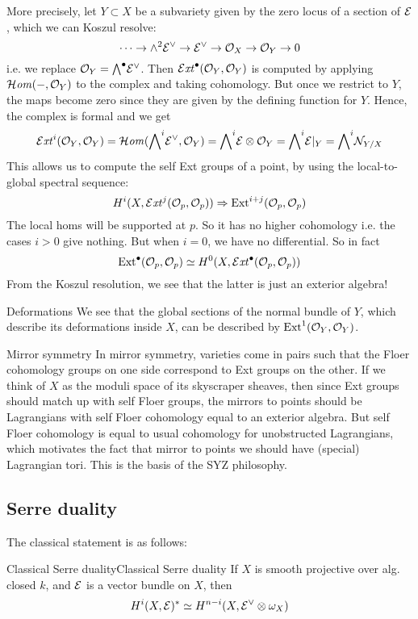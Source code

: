 More precisely, let $Y\subset X$ be a subvariety given by the zero locus of a section of $\mathcal{E}$, which we can Koszul resolve:
$$\cdots\to\wedge^2\mathcal{E}^\vee\to\mathcal{E}^\vee\to\mathcal{O}_X\to\mathcal{O}_{Y}\to0$$
i.e. we replace $\mathcal{O}_{Y}={\bigwedge}^\bullet \mathcal{E}^\vee$. Then
$\operatorname{\mathcal{E}\mathit{xt}}^\bullet(\mathcal{O}_{Y},\mathcal{O}_{Y})$ is computed by applying $\operatorname{\mathcal{H}\mathit{om}}(-,\mathcal{O}_{Y})$ to the complex and taking cohomology. But once we restrict to $Y$, the maps become zero since they are given by the defining function for $Y$. Hence, the complex is formal and we get $$\operatorname{\mathcal{E}\mathit{xt}}^i(\mathcal{O}_{Y},\mathcal{O}_{Y})=\operatorname{\mathcal{H}\mathit{om}}({\bigwedge}^i \mathcal{E}^\vee, \mathcal{O}_{Y})={\bigwedge}^i \mathcal{E} \otimes \mathcal{O}_{Y}={\bigwedge}^i \mathcal{E}|_{Y}={\bigwedge}^i \mathcal{N}_{{Y/X}}$$ This allows us to compute the self Ext groups of a point, by using the local-to-global spectral sequence:$$H^i(X, \operatorname{\mathcal{E}\mathit{xt}}^j(\mathcal{O}_{p}, \mathcal{O}_{p}))\Rightarrow \operatorname{Ext}^{i+j}(\mathcal{O}_{p}, \mathcal{O}_{p})$$The local homs will be supported at $p$. So it has no higher cohomology i.e. the cases $i>0$ give nothing. But when $i=0$, we have no differential. So in fact $$\operatorname{Ext}^\bullet(\mathcal{O}_{p}, \mathcal{O}_{p})\simeq H^0(X, \operatorname{\mathcal{E}\mathit{xt}}^\bullet(\mathcal{O}_{p}, \mathcal{O}_{p}))$$
From the Koszul resolution, we see that the latter is just an exterior algebra!
\begin{remark}{Deformations}{}
    We see that the global sections of the normal bundle of $Y$, which describe its deformations inside $X$, can be described by $\operatorname{Ext}^1(\mathcal{O}_Y,\mathcal{O}_Y)$.
\end{remark}
\begin{remark}{Mirror symmetry}{}
    In mirror symmetry, varieties come in pairs such that the Floer cohomology groups on one side correspond to Ext groups on the other. If we think of $X$ as the moduli space of its skyscraper sheaves, then since Ext groups should match up with self Floer groups, the mirrors to points should be Lagrangians with self Floer cohomology equal to an exterior algebra. But self Floer cohomology is equal to usual cohomology for unobstructed Lagrangians, which motivates the fact that mirror to points we should have (special) Lagrangian tori. This is the basis of the SYZ philosophy.

\end{remark}

\subsection{Serre duality}

The classical statement is as follows:

\begin{proposition}{Classical Serre duality}{Classical Serre duality}
    If $X$ is smooth projective over alg. closed $k$, and $\mathcal{E}$ is a vector bundle on $X$, then $$H^i(X,\mathcal{E})^*\simeq H^{n-i}(X, \mathcal{E}^\vee\otimes \omega_{X})$$
\end{proposition}

